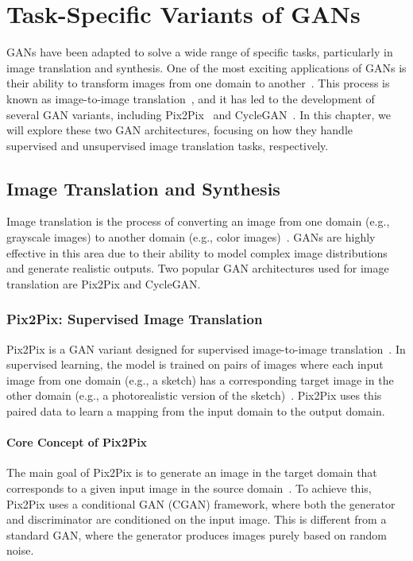 \chapter{Task-Specific Variants of GANs}
GANs have been adapted to solve a wide range of specific tasks, particularly in image translation and synthesis. One of the most exciting applications of GANs is their ability to transform images from one domain to another~\cite{sharma2024generative}. This process is known as image-to-image translation~\cite{isola2017image}, and it has led to the development of several GAN variants, including Pix2Pix~\cite{qu2019enhanced} and CycleGAN~\cite{chu2017cyclegan}. In this chapter, we will explore these two GAN architectures, focusing on how they handle supervised and unsupervised image translation tasks, respectively.

\section{Image Translation and Synthesis}
Image translation is the process of converting an image from one domain (e.g., grayscale images) to another domain (e.g., color images)~\cite{pang2021image}. GANs are highly effective in this area due to their ability to model complex image distributions and generate realistic outputs. Two popular GAN architectures used for image translation are Pix2Pix and CycleGAN.

\subsection{Pix2Pix: Supervised Image Translation}
Pix2Pix is a GAN variant designed for supervised image-to-image translation~\cite{mustafa2020transformation}. In supervised learning, the model is trained on pairs of images where each input image from one domain (e.g., a sketch) has a corresponding target image in the other domain (e.g., a photorealistic version of the sketch)~\cite{qu2019enhanced}. Pix2Pix uses this paired data to learn a mapping from the input domain to the output domain.

\subsubsection{Core Concept of Pix2Pix}
The main goal of Pix2Pix is to generate an image in the target domain that corresponds to a given input image in the source domain~\cite{guo2020zero}. To achieve this, Pix2Pix uses a conditional GAN (CGAN) framework, where both the generator and discriminator are conditioned on the input image. This is different from a standard GAN, where the generator produces images purely based on random noise.

